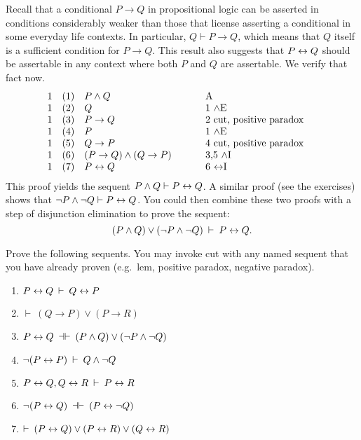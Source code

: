 Recall that a conditional $P\to Q$ in propositional logic can be
asserted in conditions considerably weaker than those that license
asserting a conditional in some everyday life contexts.  In
particular, $Q\vdash P\to Q$, which means that $Q$ itself is a
sufficient condition for $P\to Q$.  This result also suggests that
$P\leftrightarrow Q$ should be assertable in any context where both $P$ and $Q$
are assertable.  We verify that fact now.
\[ \begin{array}{l l >{$}p{4cm}<{$} p{4cm}}
      1 & (1) & P\wedge Q & A \\
      1 & (2) & Q & 1 $\wedge$E \\
      1 & (3) & P\to Q & 2 cut, positive paradox \\
      1 & (4) & P  & 1 $\wedge$E \\
      1 & (5) & Q\to P & 4 cut, positive paradox \\
      1 & (6) & (P\to Q)\wedge (Q\to P) & 3,5 $\wedge$I \\
      1 & (7) & P\lra Q   & 6 $\lra$I \end{array} \]
This proof yields the sequent $P\wedge Q\vdash P\leftrightarrow Q$.  A similar
proof (see the exercises) shows that $\neg P\wedge\neg Q\vdash P\leftrightarrow
Q$.  You could then combine these two proofs with a step of
disjunction elimination to prove the sequent:
\[ (P\wedge Q)\vee (\neg P\wedge\neg Q)\: \vdash \: P\leftrightarrow Q .\]

\begin{exercises} Prove the following sequents.  You may invoke cut
  with any named sequent that you have already proven (e.g.\ lem,
  positive paradox, negative paradox).
   \begin{enumerate}
\item $P\leftrightarrow Q\:\vdash\: Q\leftrightarrow P$     
\item $\vdash\: (Q\to P)\vee (P\to R)$     
\item $P\leftrightarrow Q\:\dashv\vdash\: (P\wedge Q)\vee (\neg P\wedge \neg Q)$     
\item $\neg (P\leftrightarrow P)\:\vdash\: Q\wedge\neg Q$
\item $P\leftrightarrow Q, Q\leftrightarrow R\:\vdash\: P\leftrightarrow R$
\item $\neg (P\leftrightarrow Q)\:\dashv\vdash\: (P\leftrightarrow \neg Q)$  
\item $\vdash\: (P\leftrightarrow Q)\vee (P\leftrightarrow R)\vee (Q\leftrightarrow R)$
\end{enumerate}
\end{exercises}



